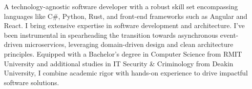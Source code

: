 
\par{
A technology-agnostic software developer with a robust skill set encompassing languages like C\#, Python, Rust, and front-end frameworks such as Angular and React. I bring extensive expertise in software development and architecture. I've been instrumental in spearheading the transition towards asynchronous event-driven microservices, leveraging domain-driven design and clean architecture principles. Equipped with a Bachelor's degree in Computer Science from RMIT University and additional studies in IT Security \& Criminology from Deakin University, I combine academic rigor with hands-on experience to drive impactful software solutions.
}